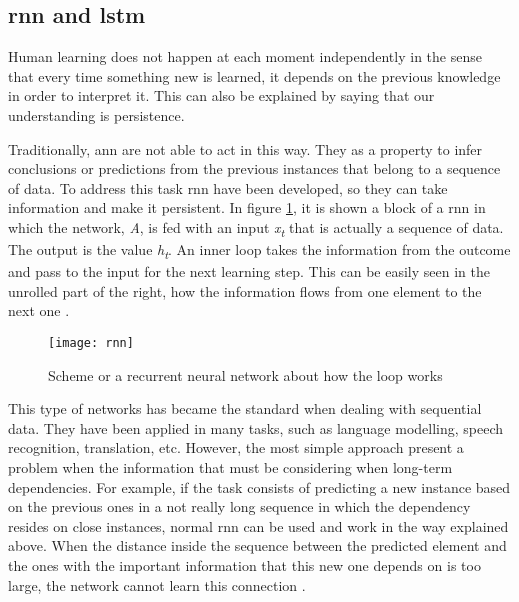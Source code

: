 
\subsection{\acrlong{rnn} and \acrlong{lstm}}
\label{subsection:rnn-lstm}

	Human learning does not happen at each moment independently in the sense that every time something new is learned, it depends on the previous knowledge in order to interpret it. This can also be explained by saying that our understanding is persistence.
	
	Traditionally, \acrlong{ann} are not able to act in this way. They  as a property to infer conclusions or predictions from the previous instances that belong to a sequence of data. To address this task \acrfull{rnn} have been developed, so they can take information and make it persistent. In figure \ref{fig:mesh39}, it is shown a block of a \acrshort{rnn} in which the network, \textit{A}, is fed with an input \textit{x\textsubscript{t}} that is actually a sequence of data. The output is the value \textit{h\textsubscript{t}}. An inner loop takes the information from the outcome and pass to the input for the next learning step. This can be easily seen in the unrolled part of the right, how the information flows from one element to the next one \cite{Olah2015}. 
	
	\begin{figure}[h]
		\centering
		\captionsetup{justification=centering}
		\texttt{[image: rnn]}
		\caption{Scheme or a recurrent neural network about how the loop works }
		\label{fig:mesh39}
	\end{figure}

	This type of networks has became the standard when dealing with sequential data. They have been applied in many tasks, such as language modelling, speech recognition, translation, etc. However, the most simple approach present a problem when the information that must be considering when long-term dependencies. For example, if the task consists of predicting a new instance based on the previous ones in a not really long sequence in which the dependency resides on close instances, normal \acrshort{rnn} can be used and work in the way explained above. When the distance inside the sequence between the predicted element and the ones with the important information that this new one depends on is too large, the network cannot learn this connection \cite{Olah2015}. 
	
